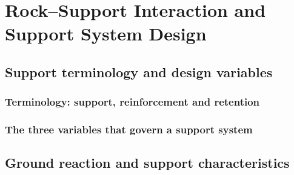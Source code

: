 \chapter{Rock--Support Interaction and Support System Design}
\label{ch:support-interaction}


\section{Support terminology and design variables}
\label{sec:support-terminology-and-design-variables}

\subsection{Terminology: support, reinforcement and retention}
\label{sec:support-terminology}

\subsection{The three variables that govern a support system}
\label{sec:support-three-variables}

\section{Ground reaction and support characteristics}
\label{sec:ground-reaction-and-support-characteristics}

